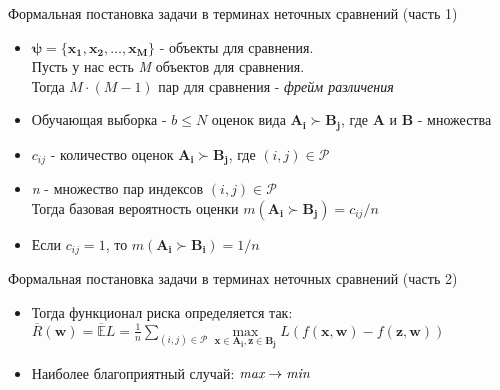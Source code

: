 \documentclass[11pt]{beamer}
\newcommand{\Rho}{%
	\mathcal{P}%
}
\begin{document}
\begin{frame}{Формальная постановка задачи в терминах неточных сравнений (часть 1)}

\begin{itemize}
	\item \(\mathbf{\psi} = \{\mathbf{x_1}, \mathbf{x_2}, \dots, \mathbf{x_M}\}\) - объекты для сравнения. \\
	Пусть у нас есть \emph{M} объектов для сравнения. \\
	Тогда \(M \cdot (M-1)\) пар для сравнения - \emph{фрейм различения}
	\item Обучающая выборка - \(b \leq N\) оценок вида \(\mathbf{A_i} \succ \mathbf{B_j}\), где \(\mathbf{A}\) и \(\mathbf{B}\) - множества
	\item \(c_{ij}\) - количество оценок \(\mathbf{A_i} \succ \mathbf{B_j}\), где \((i, j) \in \Rho\)
	\item \emph{n} - множество пар индексов \((i, j) \in \Rho\) \\
		Тогда базовая вероятность оценки \(m(\mathbf{A_i} \succ \mathbf{B_j}) = c_{ij} / n\)
	\item Если \(c_{ij} = 1\), то \(m(\mathbf{A_i} \succ \mathbf{B_i}) = 1/n\)
\end{itemize}

\end{frame}
\begin{frame}{Формальная постановка задачи в терминах неточных сравнений (часть 2)}

\begin{itemize}
	\item Тогда функционал риска определяется так:
	\(\overline{R}(\mathbf{w}) = \mathbb{\overline{E}}L = \frac{1}{n} \sum \limits_{(i,j) \in \Rho} \underset{\mathbf{x} \in \mathbf{A_i}, \mathbf{z} \in \mathbf{B_j}}{\operatorname{max}}L(f(\mathbf{x}, \mathbf{w}) - f(\mathbf{z}, \mathbf{w}))\)
	\item Наиболее благоприятный случай: \(\emph{max} \rightarrow \emph{min}\)
\end{itemize}

\end{frame}
\end{document}
